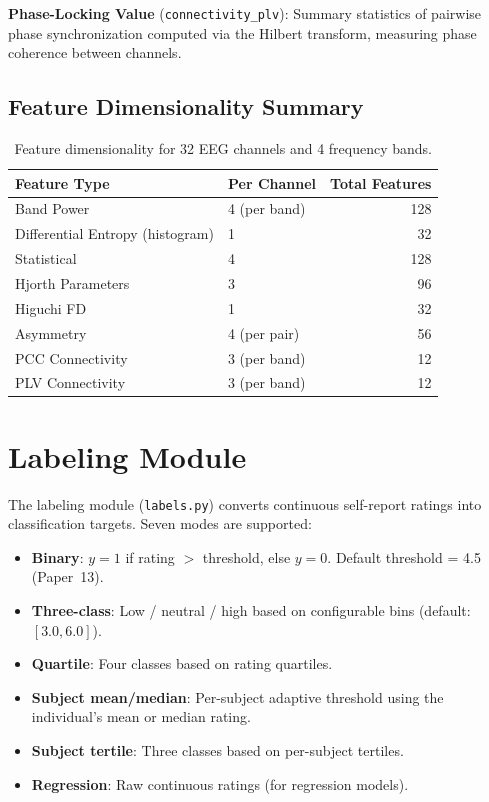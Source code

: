 \documentclass[12pt,a4paper]{report}
\begin{document}
\textbf{Phase-Locking Value} (\texttt{connectivity\_plv}): Summary statistics
of pairwise phase synchronization computed via the Hilbert transform, measuring
phase coherence between channels.

\subsection{Feature Dimensionality Summary}

\begin{table}[H]
\centering
\caption{Feature dimensionality for 32 EEG channels and 4 frequency bands.}
\label{tab:feature_dims}
\begin{tabular}{llr}
\toprule
\textbf{Feature Type} & \textbf{Per Channel} & \textbf{Total Features} \\
\midrule
Band Power         & 4 (per band)   & 128 \\
Differential Entropy (histogram) & 1 & 32 \\
Statistical        & 4              & 128 \\
Hjorth Parameters  & 3              & 96 \\
Higuchi FD         & 1              & 32 \\
Asymmetry          & 4 (per pair)   & 56 \\
PCC Connectivity   & 3 (per band)   & 12 \\
PLV Connectivity   & 3 (per band)   & 12 \\
\bottomrule
\end{tabular}
\end{table}


\section{Labeling Module}
\label{sec:labels}

The labeling module (\texttt{labels.py}) converts continuous self-report ratings
into classification targets. Seven modes are supported:

\begin{itemize}[noitemsep]
    \item \textbf{Binary}: $y = 1$ if rating $>$ threshold, else $y = 0$.
          Default threshold = 4.5 (Paper~13).
    \item \textbf{Three-class}: Low / neutral / high based on configurable bins
          (default: $[3.0, 6.0]$).
    \item \textbf{Quartile}: Four classes based on rating quartiles.
    \item \textbf{Subject mean/median}: Per-subject adaptive threshold using
          the individual's mean or median rating.
    \item \textbf{Subject tertile}: Three classes based on per-subject tertiles.
    \item \textbf{Regression}: Raw continuous ratings (for regression models).
\end{itemize}
\end{document}
